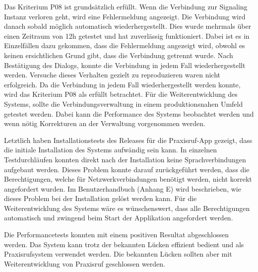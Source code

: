 Das Kriterium P08 ist grundsätzlich erfüllt.
Wenn die Verbindung zur Signaling Instanz verloren geht, wird eine Fehlermeldung angezeigt.
Die Verbindung wird danach sobald möglich automatisch wiederhergestellt.
Dies wurde mehrmals über einen Zeitraum von 12h getestet und hat zuverlässig funktioniert.
Dabei ist es in Einzelfällen dazu gekommen, dass die Fehlermeldung angezeigt wird, obwohl es keinen ersichtlichen Grund gibt, dass die Verbindung getrennt wurde.
Nach Bestätigung des Dialogs, konnte die Verbindung in jedem Fall wiederhergestellt werden.
Versuche dieses Verhalten gezielt zu reproduzieren waren nicht erfolgreich.
Da die Verbindung in jedem Fall wiederhergestellt werden konnte, wird das Kriterium P08 als erfüllt betrachtet.
Für die Weiterentwicklung des Systems, sollte die Verbindungsverwaltung in einem produktionsnahen Umfeld getestet werden.
Dabei kann die Performance des Systems beobachtet werden und wenn nötig Korrekturen an der Verwaltung vorgenommen werden.

Letztlich haben Installationstests des Releases für die Praxisruf-App gezeigt, dass die initiale Installation des Systems aufwändig sein kann.
In einzelnen Testdurchläufen konnten direkt nach der Installation keine Sprachverbindungen aufgebaut werden.
Dieses Problem konnte darauf zurückgeführt werden, dass die Berechtigungen, welche für Netzwerkverbindungen benötigt werden, nicht korrekt angefordert wurden.
Im Benutzerhandbuch (Anhang E) wird beschrieben, wie dieses Problem bei der Installation gelöst werden kann.
Für die Weiterentwicklung des Systems wäre es wünschenswert, dass alle Berechtigungen automatisch und zwingend beim Start der Applikation angefordert werden.

Die Performancetests konnten mit einem positiven Resultat abgeschlossen werden.
Das System kann trotz der bekannten Lücken effizient bedient und als Praxisrufsystem verwendet werden.
Die bekannten Lücken sollten aber mit Weiterentwicklung von Praxisruf geschlossen werden.

\clearpage
